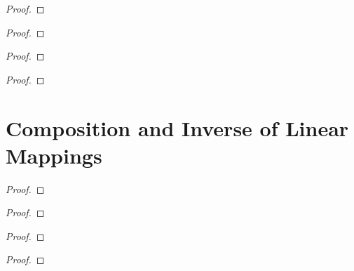 \begin{exercise}
\end{exercise}

\begin{proof}
\end{proof}

\begin{exercise}
\end{exercise}

\begin{proof}
\end{proof}

\begin{exercise}
\end{exercise}

\begin{proof}
\end{proof}

\begin{exercise}
\end{exercise}

\begin{proof}
\end{proof}

\section{Composition and Inverse of Linear Mappings}
\setcounter{exercise}{0}

\begin{exercise}
\end{exercise}

\begin{proof}
\end{proof}

\begin{exercise}
\end{exercise}

\begin{proof}
\end{proof}

\begin{exercise}
\end{exercise}

\begin{proof}
\end{proof}

\begin{exercise}
\end{exercise}

\begin{proof}
\end{proof}


